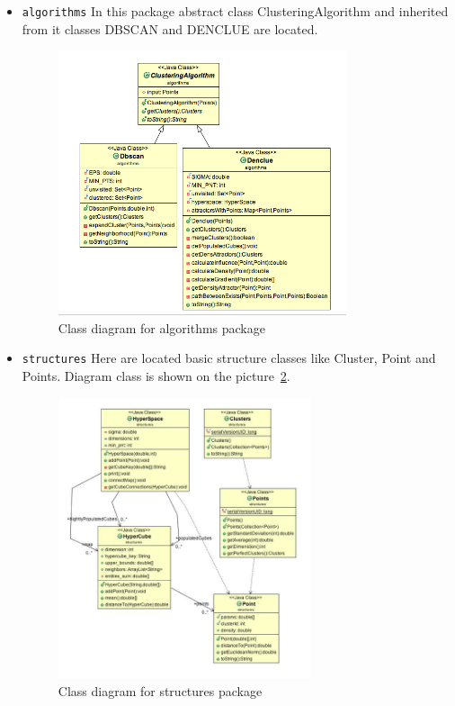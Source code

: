 \documentclass[12pt, a4paper, notitlepage, oneside]{article}
\begin{document}
\begin{itemize}
	\item \texttt{algorithms} In this package abstract class ClusteringAlgorithm and inherited from it classes DBSCAN and DENCLUE are located. 

	\begin{figure}[!ht]
 	\centering
	\includegraphics[width=0.8\textwidth]{images/algorithms_package.png}
 	\caption[]
	{Class diagram for algorithms package}
\label{algorithms}
	\end{figure}

	\item \texttt{structures} Here are located basic structure classes like Cluster, Point and Points. Diagram class is shown on the picture~\ref{structures}.

	\begin{figure}[!ht]
 	\centering
	\includegraphics[width=0.7\textwidth]{images/structures_package.png}
 	\caption[]
	{Class diagram for structures package}
\label{structures}
	\end{figure}


\end{itemize}
\end{document}
